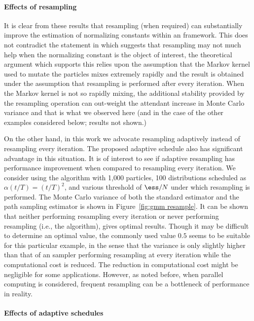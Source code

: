 \paragraph{Effects of resampling}

It is clear from these results that resampling (when required) can substantially improve the estimation of normalizing constants within an \smc framework. This does not contradict the statement in \cite{DelMoral:2006hc} which suggests that resampling may not much help when the normalizing constant is the object of interest, the theoretical argument which supports this relies upon the assumption that the Markov kernel used to mutate the particles mixes extremely rapidly and the result is obtained under the assumption that resampling is performed after every iteration. When the Markov kernel is not so rapidly mixing, the additional stability provided by the resampling operation can out-weight the attendant increase in Monte Carlo variance and that is what we observed here (and in the case of the other examples considered below; results not shown.)



On the other hand, in this work we advocate resampling adaptively instead of resampling every iteration. The proposed adaptive schedule also has significant advantage in this situation. It is of interest to see if adaptive resampling has performance improvement when compared to resampling every iteration. We consider using the \smc[2] algorithm with 1,000 particles, 100 distributions scheduled as $\alpha(t/T) = (t/T)^2$, and various threshold of $\ess/N$ under which resampling is performed. The Monte Carlo variance of both the standard estimator and the path sampling estimator is shown in Figure~\ref{fig:gmm resample}. It can be shown that neither performing resampling every iteration or never performing resampling (i.e., the \ais algorithm), gives optimal results. Though it may be difficult to determine an optimal value, the commonly used value $0.5$ seems to be suitable for this particular example, in the sense that the variance is only slightly higher than that of an sampler performing resampling at every iteration while the computational cost is reduced. The reduction in computational cost might be negligible for some applications. However, as noted before, when parallel computing is considered, frequent resampling can be a bottleneck of performance in reality.

\paragraph{Effects of adaptive schedules}

